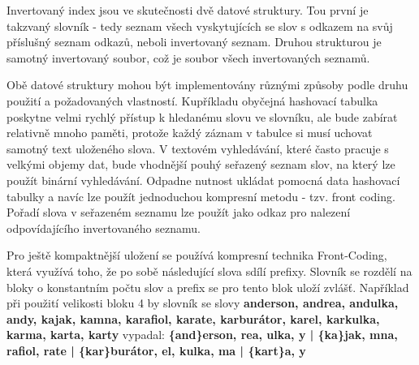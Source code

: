 \documentclass[11pt]{article}
\begin{document}
Invertovaný index jsou ve skutečnosti dvě datové struktury. Tou první je
takzvaný slovník - tedy seznam všech vyskytujících se slov s odkazem na svůj
příslušný seznam odkazů, neboli invertovaný seznam. Druhou strukturou je
samotný invertovaný soubor, což je soubor všech invertovaných seznamů.

Obě datové struktury mohou být implementovány různými způsoby podle druhu
použití a požadovaných vlastností. Kupříkladu obyčejná hashovací tabulka
poskytne velmi rychlý přístup k hledanému slovu ve slovníku, ale bude zabírat
relativně mnoho paměti, protože každý záznam v tabulce si musí uchovat samotný
text uloženého slova. V textovém vyhledávání, které často pracuje s velkými
objemy dat, bude vhodnější pouhý seřazený seznam slov, na který lze použít
binární vyhledávání. Odpadne nutnost ukládat pomocná data hashovací tabulky a
navíc lze použít jednoduchou kompresní metodu - tzv. front coding. Pořadí slova
v seřazeném seznamu lze použít jako odkaz pro nalezení odpovídajícího
invertovaného seznamu.

%

Pro ještě kompaktnější uložení se používá kompresní technika Front-Coding,
která využívá toho, že po sobě následující slova sdílí prefixy. Slovník se
rozdělí na bloky o konstantním počtu slov a prefix se pro tento blok uloží
zvlášť. Například při použití velikosti bloku 4 by slovník se slovy
\textbf{anderson, andrea, andulka, andy, kajak, kamna, karafiol, karate,
karburátor, karel, karkulka, karma, karta, karty} vypadal:
\textbf{\{and\}erson, rea, ulka, y | \{ka\}jak, mna, rafiol, rate | \{kar\}burátor, el, kulka, ma | \{kart\}a, y}
\end{document}
